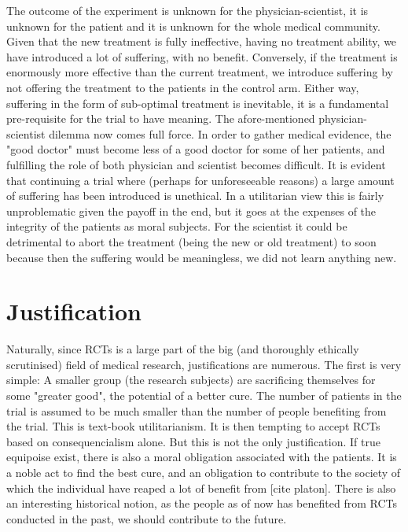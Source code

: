 \documentclass[12p]{article}
\begin{document}
The outcome of the experiment is unknown for the physician-scientist, it is unknown for the patient and it is unknown for the whole medical community.
Given that the new treatment is fully ineffective, having no treatment ability, we have introduced a lot of suffering, with no benefit.
Conversely, if the treatment is enormously more effective than the current treatment, we introduce suffering by not offering the treatment to the patients in the control arm.
Either way, suffering in the form of sub-optimal treatment is inevitable, it is a fundamental pre-requisite for the trial to have meaning.
The afore-mentioned physician-scientist dilemma now comes full force.
In order to gather medical evidence, the "good doctor" must become less of a good doctor for some of her patients, and fulfilling the role of both physician and scientist becomes difficult.
It is evident that continuing a trial where (perhaps for unforeseeable reasons) a large amount of suffering has been introduced is unethical.
In a utilitarian view this is fairly unproblematic given the payoff in the end, but it goes at the expenses of the integrity of the patients as moral subjects.
For the scientist it could be detrimental to abort the treatment (being the new or old treatment) to soon because then the suffering would be meaningless, we did not learn anything new.



\section{Justification}

Naturally, since RCTs is a large part of the big (and thoroughly ethically scrutinised) field of medical research, justifications are numerous.
The first is very simple:
A smaller group (the research subjects) are sacrificing themselves for some "greater good", the potential of a better cure.
The number of patients in the trial is assumed to be much smaller than the number of people benefiting from the trial.
This is text-book utilitarianism.%
It is then tempting to accept RCTs based on consequencialism alone.
But this is not the only justification.
If true equipoise exist, there is also a moral obligation associated with the patients.
It is a noble act to find the best cure, and an obligation to contribute to the society of which the individual have reaped a lot of benefit from [cite platon].
There is also an interesting historical notion, as the people as of now has benefited from RCTs conducted in the past, we should contribute to the future.
\end{document}
